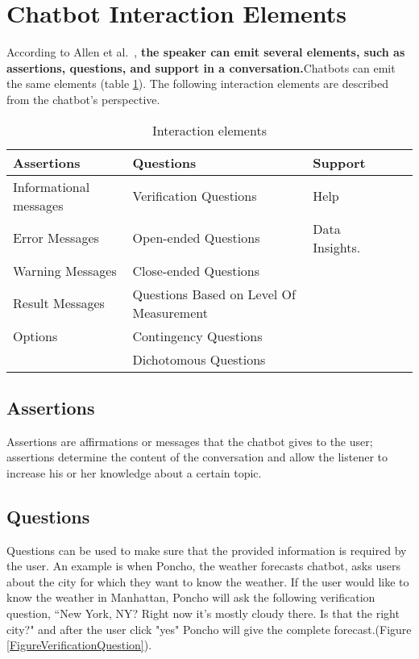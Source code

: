 \documentclass[a4paper,10pt]{article}
\begin{document}
\section{Chatbot Interaction Elements}
According to Allen et al.~\cite{allen1978conversation}, \textbf{the speaker can emit several elements, such as assertions, questions, and support in a conversation.}Chatbots can emit the same elements (table \ref{InteractionElementsTable}). The following interaction elements are described from the chatbot's perspective. 


\begin{table}[]
\centering
\begin{tabular}{lllll}
\hline
\textbf{Assertions}    & \textbf{Questions}     & \textbf{Support}   \\
\hline
Informational messages & Verification Questions & Help      \\
Error Messages         & Open-ended Questions         & Data Insights.  \\
Warning Messages                       & Close-ended Questions        &       \\
Result Messages                       & Questions Based on Level Of Measurement       &       \\
Options                       & Contingency Questions       &       \\    
                       & Dichotomous Questions       &       \\  
     \hline                   
\end{tabular}
\caption{Interaction elements}
\label{InteractionElementsTable}
\end{table}

\subsection{Assertions}
Assertions are affirmations or messages that the chatbot gives to the user; assertions determine the content of the conversation and allow the listener to increase his or her knowledge about a certain topic. 

\subsection{Questions}
Questions can be used to make sure that the provided information is required by the user. An example is when Poncho, the weather forecasts chatbot, asks users about the city for which they want to know the weather. If the user would like to know the weather in Manhattan, Poncho will ask the following verification question, ``New York, NY? Right now it's mostly cloudy there. Is that the right city?" and after the user click "yes" Poncho will give the complete forecast.(Figure \ref{FigureVerificationQuestion}).
\end{document}
